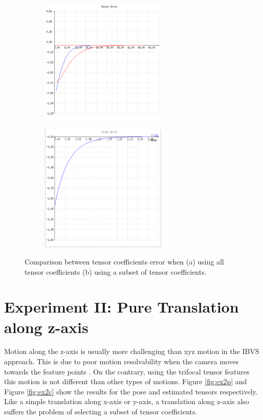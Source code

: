 \begin{figure}[ht!]
\centering
\begin{adjustbox}{minipage=.9\linewidth,margin=1ex,bgcolor=black!5,margin=0.3pt,bgcolor=black!30,margin=2ex}
  \centering
  \begin{subfigure}{.48\textwidth}
    \centering
    \includegraphics[width=60mm]{figures/plots/ex1cerror.png}
    \caption{}
    \label{fig:ex1comparisona}
  \end{subfigure}
  \begin{subfigure}{.48\textwidth}
    \centering
    \includegraphics[width=60mm]{figures/plots/ex1subset.png}
    \caption{}
    \label{fig:ex1comparisonb}
  \end{subfigure}
  \caption{Comparison between tensor coefficients error when (a) using all tensor coefficients (b) using a subset of tensor coefficients.}
  \label{fig:ex1comparison}
  \end{adjustbox}
\end{figure}

\section{Experiment II: Pure Translation along z-axis}
Motion along the z-axis is usually more challenging than xyz motion in the IBVS approach. This is due to poor motion resolvability when the camera moves towards the feature points \cite{nelson1996vision}. On the contrary, using the trifocal tensor features this motion is not different than other types of motions. Figure \ref{fig:ex2p} and Figure \ref{fig:ex2c} show the results for the pose and estimated tensors respectively. Like a simple translation along x-axis or y-axis, a translation along z-axis also suffers the problem of selecting a subset of tensor coefficients.

